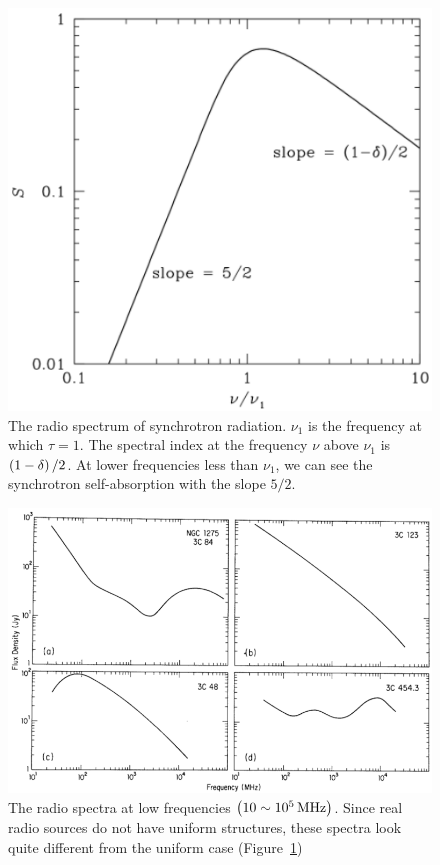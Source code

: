 \begin{figure}[htbp]
	\centering
	\includegraphics[width=.6\linewidth]{Chapter_2/Figures/NRAO_radio5n7.png}
    \caption[The spectrum of synchrotron radiation]{\label{fig:nrao_radio5n7}
        The radio spectrum of synchrotron radiation.
        $\nu_1$ is the frequency at which $\tau=1$.
        The spectral index at the frequency $\nu$ above $\nu_1$ is $\left(1-\delta\right)/2$.
        At lower frequencies less than $\nu_1$, we can see the synchrotron self-absorption with the slope $5/2$.
    }
\end{figure}


\begin{figure}[htbp]
	\centering
	\includegraphics[width=.9\linewidth]{Chapter_2/Figures/NRAO_radio5n8.png}
    \caption[The spectrum of synchrotron radiation from real sources]{\label{fig:nrao_radio5n8}
        The radio spectra at low frequencies $\left(10 \sim 10^5\,\mathrm{MHz}\right)$.
        Since real radio sources do not have uniform structures, these spectra look quite different from the uniform case (Figure~\ref{fig:nrao_radio5n7})
    }
\end{figure}

